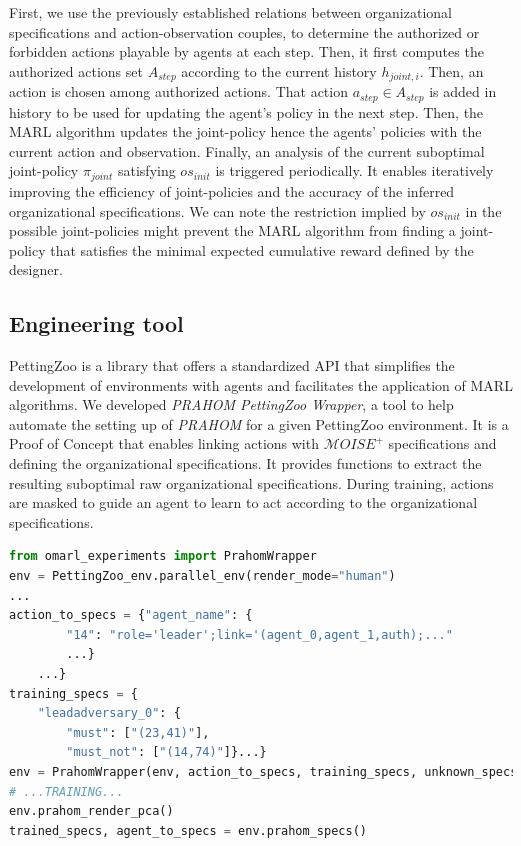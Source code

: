 \documentclass[runningheads]{llncs}
\newcounter{relation}
\begin{document}
First, we use the previously established relations between organizational specifications and action-observation couples, to determine the authorized or forbidden actions playable by agents at each step.
Then, it first computes the authorized actions set $A_{step}$ according to the current history $h_{joint,i}$. Then, an action is chosen among authorized actions. That action $a_{step} \in A_{step}$ is added in history to be used for updating the agent's policy in the next step. Then, the MARL algorithm updates the joint-policy hence the agents' policies with the current action and observation.
Finally, an analysis of the current suboptimal joint-policy $\pi_{joint}$ satisfying $os_{init}$ is triggered periodically. It enables iteratively improving the efficiency of joint-policies and the accuracy of the inferred organizational specifications.
We can note the restriction implied by $os_{init}$ in the possible joint-policies might prevent the MARL algorithm from finding a joint-policy that satisfies the minimal expected cumulative reward defined by the designer.

\subsection{Engineering tool}

PettingZoo is a library that offers a standardized API that simplifies the development of environments with agents and facilitates the application of MARL algorithms.
We developed \emph{PRAHOM PettingZoo Wrapper}\label{PettingZoo-wrapper}, a tool to help automate the setting up of \emph{PRAHOM} for a given PettingZoo environment.
It is a Proof of Concept that enables linking actions with $\mathcal{M}OISE^+$ specifications and defining the organizational specifications. It provides functions to extract the resulting suboptimal raw organizational specifications. During training, actions are masked to guide an agent to learn to act according to the organizational specifications.

\begin{lstlisting}[language=Python, caption=PRAHOM PettingZoo Wrapper basic use, label={lst:wrapper_basic_use}]
from omarl_experiments import PrahomWrapper
env = PettingZoo_env.parallel_env(render_mode="human")
...
action_to_specs = {"agent_name": {
        "14": "role='leader';link='(agent_0,agent_1,auth);..."
        ...}    
    ...}
training_specs = {
    "leadadversary_0": {
        "must": ["(23,41)"],
        "must_not": ["(14,74)"]}...}
env = PrahomWrapper(env, action_to_specs, training_specs, unknown_specs_inference=True, pca_output=True)
# ...TRAINING...
env.prahom_render_pca()
trained_specs, agent_to_specs = env.prahom_specs()
\end{lstlisting}
\end{document}
